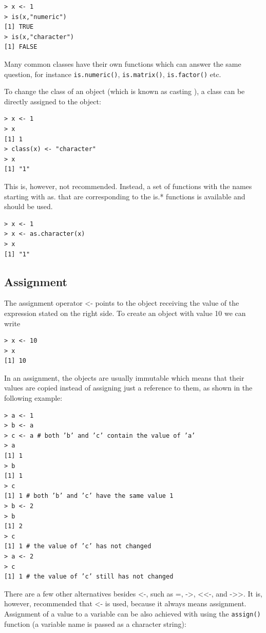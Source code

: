 \begin{verbatim}
> x <- 1
> is(x,"numeric")
[1] TRUE
> is(x,"character")
[1] FALSE
\end{verbatim}

Many common classes have their own functions which can answer the same
question, for instance \texttt{is.numeric()}, \texttt{is.matrix()}, \texttt{is.factor()} etc.

To change the class of an object (which is known as casting \cite{ref58}), a class can
be directly assigned to the object:

\begin{verbatim}
> x <- 1
> x
[1] 1
> class(x) <- "character"
> x
[1] "1"
\end{verbatim}

This is, however, not recommended. Instead, a set of functions with the names
starting with as. that are corresponding to the is.* functions is available and
should be used.

\begin{verbatim}
> x <- 1
> x <- as.character(x)
> x
[1] "1"
\end{verbatim}

\subsection{Assignment}

The assignment operator <- points to the object receiving the value of the expression stated on the right side. To create an object with value 10 we can write

\begin{verbatim}
> x <- 10
> x
[1] 10
\end{verbatim}

In an assignment, the objects are usually immutable which means that their
values are copied instead of assigning just a reference to them, as shown in the
following example:

\begin{verbatim}
> a <- 1
> b <- a
> c <- a # both ’b’ and ’c’ contain the value of ’a’
> a
[1] 1
> b
[1] 1
> c
[1] 1 # both ’b’ and ’c’ have the same value 1
> b <- 2
> b
[1] 2
> c
[1] 1 # the value of ’c’ has not changed
> a <- 2
> c
[1] 1 # the value of ’c’ still has not changed
\end{verbatim}

There are a few other alternatives besides <-, such as =, ->, <<-, and ->>.
It is, however, recommended that <- is used, because it always means assignment. Assignment of a value to a variable can be also achieved with using the
\texttt{assign()} function (a variable name is passed as a character string):

